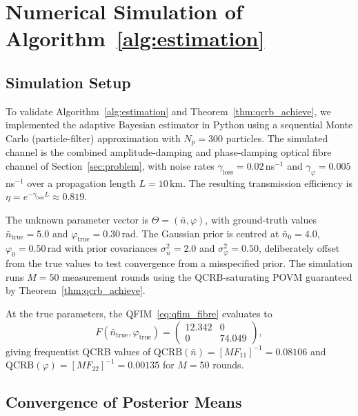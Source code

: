 \documentclass[journal,twocolumn]{IEEEtran}
\theoremstyle{definition}
\theoremstyle{plain}
\begin{document}
\section{Numerical Simulation of Algorithm~\ref{alg:estimation}}
\label{sec:simulation}

\subsection{Simulation Setup}

To validate Algorithm~\ref{alg:estimation} and
Theorem~\ref{thm:qcrb_achieve}, we implemented the adaptive
Bayesian estimator in Python using a sequential Monte Carlo
(particle-filter) approximation with $N_p = 300$ particles.
The simulated channel is the combined amplitude-damping and
phase-damping optical fibre channel of
Section~\ref{sec:problem}, with noise rates
$\gamma_{\mathrm{loss}} = 0.02$\,ns$^{-1}$ and
$\gamma_\varphi = 0.005$\,ns$^{-1}$ over a propagation
length $L = 10$\,km.  The resulting transmission efficiency
is $\eta = e^{-\gamma_{\mathrm{loss}}L} \approx 0.819$.

The unknown parameter vector is
$\Theta = (\bar n,\varphi)$, with ground-truth values
$\bar n_{\mathrm{true}} = 5.0$ and
$\varphi_{\mathrm{true}} = 0.30$\,rad.  The Gaussian prior
is centred at $\bar n_0 = 4.0$, $\varphi_0 = 0.50$\,rad
with prior covariances $\sigma_{\bar n}^2 = 2.0$ and
$\sigma_\varphi^2 = 0.50$, deliberately offset from the
true values to test convergence from a misspecified prior.
The simulation runs $M = 50$ measurement rounds using the
QCRB-saturating POVM guaranteed by
Theorem~\ref{thm:qcrb_achieve}.

At the true parameters, the QFIM~\eqref{eq:qfim_fibre}
evaluates to
\begin{equation}
  F(\bar n_{\mathrm{true}},\varphi_{\mathrm{true}}) =
  \begin{pmatrix}
    12.342 & 0 \\ 0 & 74.049
  \end{pmatrix},
\end{equation}
giving frequentist QCRB values of
$\mathrm{QCRB}(\bar n) = [MF_{11}]^{-1} = 0.08106$ and
$\mathrm{QCRB}(\varphi) = [MF_{22}]^{-1} = 0.00135$
for $M = 50$ rounds.

\subsection{Convergence of Posterior Means}
\end{document}

